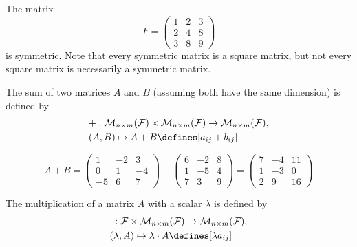 \begin{exm}
	The matrix
	\begin{equation*}
		F = \begin{pmatrix}
			1 & 2 & 3 \\
			2 & 4 & 8 \\
			3 & 8 & 9
		\end{pmatrix}
	\end{equation*}
	is symmetric. Note that every symmetric matrix is a square matrix, but not
	every square matrix is necessarily a symmetric matrix.
\end{exm}

\begin{definition}\label{def-matrix-addition}
	The sum of two matrices $A$ and $B$ (assuming both have the same dimension)
	is defined by
	\begin{align*}
		 & + : \mathcal{M}_{n \times m}(\mathcal{F}) \times
		\mathcal{M}_{n \times m}(\mathcal{F}) \rightarrow
		\mathcal{M}_{n \times m}(\mathcal{F}),              \\
		 & (A,B) \mapsto A + B\defines[a_{ij} + b_{ij}]
	\end{align*}
\end{definition}

\begin{exm}
	\begin{equation*}
		A + B = \begin{pmatrix}
			1  & -2 & 3  \\
			0  & 1  & -4 \\
			-5 & 6  & 7
		\end{pmatrix} +
		\begin{pmatrix}
			6 & -2 & 8 \\
			1 & -5 & 4 \\
			7 & 3  & 9
		\end{pmatrix} =
		\begin{pmatrix}
			7 & -4 & 11 \\
			1 & -3 & 0  \\
			2 & 9  & 16
		\end{pmatrix}
	\end{equation*}
\end{exm}

\begin{definition}\label{def-scalar-multiplication}
	The multiplication of a matrix $A$ with a scalar $\lambda$ is defined by
	\begin{align*}
		 & \cdot : \mathcal{F} \times \mathcal{M}_{n \times m}(\mathcal{F})
		\rightarrow \mathcal{M}_{n \times m}(\mathcal{F}),                  \\
		 & (\lambda, A) \mapsto \lambda \cdot A\defines[\lambda a_{ij}]
	\end{align*}
\end{definition}

